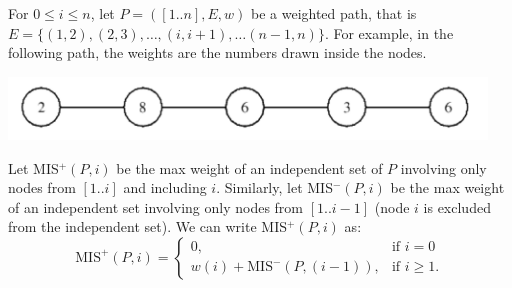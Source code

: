 \documentclass[11pt]{article}
\begin{document}
For $0 \le i \le n$, let $P = ([1..n],E,w)$ be a weighted path, that is $E = \{(1,2),
(2,3), \ldots, (i,i+1), \ldots (n-1,n)\}$.  
For example, in the following path, the weights are the numbers drawn
inside the nodes.  

\vspace{.1in}
\hspace{.75in}
\includegraphics[width=5in]{../figs/path-graph.png}

\vspace{.1in}

\noindent
Let MIS$^+(P,i)$ be the max weight of an independent
set of $P$ involving only nodes from $[1..i]$ and including $i$.  
Similarly, let MIS$^-(P,i)$ be the max weight of an independent set
involving only nodes from $[1..i-1]$ (node $i$ is excluded from the independent
set). We can write MIS$^+(P,i)$ as:
\[
\mbox{MIS}^+(P,i) = \left \{\begin{array}{ll}
                   0, & \mbox{if } i = 0 \\
                   w(i) +  \mbox{MIS}^-(P,(i-1)), & \mbox{if } i \ge 1.
                   \end{array} \right.
\]
\end{document}

